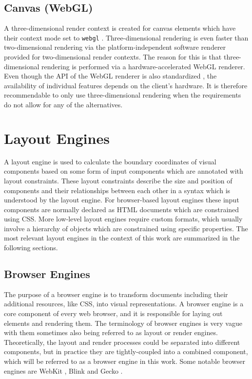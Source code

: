 \subsection{Canvas (WebGL)}
\label{sec:CanvasWebGL}

A three-dimensional render context is created for canvas elements which have their context mode set to \lstinline{webgl} .
Three-dimensional rendering is even faster than two-dimensional rendering via the platform-independent software renderer provided for two-dimensional render contexts.
The reason for this is that three-dimensional rendering is performed via a hardware-accelerated WebGL renderer.
Even though the API of the WebGL renderer is also standardized \parencite{WebGL}, the availability of individual features depends on the client's hardware.
It is therefore recommendable to only use three-dimensional rendering when the requirements do not allow for any of the alternatives.

\section{Layout Engines}
\label{sec:LayoutEngines}

A layout engine is used to calculate the boundary coordinates of visual components based on some form of input components which are annotated with layout constraints. 
These layout constraints describe the size and position of components and their relationships between each other in a syntax which is understood by the layout engine. 
For browser-based layout engines these input components are normally declared as HTML documents which are constrained using CSS. 
More low-level layout engines require custom formats, which usually involve a hierarchy of objects which are constrained using specific properties. 
The most relevant layout engines in the context of this work are summarized in the following sections.

\subsection{Browser Engines}
\label{sec:BrowserEngines}

The purpose of a browser engine is to transform documents including their additional resources, like CSS, into visual representations. 
A browser engine is a core component of every web browser, and it is responsible for laying out elements and rendering them. 
The terminology of browser engines is very vague with them sometimes also being referred to as layout or render engines. 
Theoretically, the layout and render processes could be separated into different components, but in practice they are tightly-coupled into a combined component, which will be referred to as a browser engine in this work. 
Some notable browser engines are WebKit \parencite{WebKit}, Blink \parencite{Blink} and Gecko \parencite{Gecko}.

